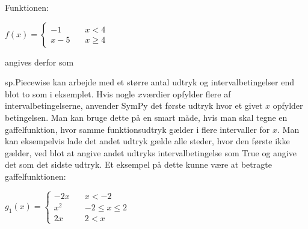 \documentclass[letterpaper,10pt,english]{jupyterBook}
\begin{document}
\begin{sphinxVerbatim}[commandchars=\\\{\}]
   
\end{sphinxVerbatim}

Funktionen:

\(f(x) = \begin{cases} -1 \quad &x < 4 \\ x - 5 \quad &x \geq 4\end{cases}\)

angives derfor som

\begin{sphinxVerbatim}[commandchars=\\\{\}]
         

        
\end{sphinxVerbatim}

\noindent{}

sp.Piecewise kan arbejde med et større antal udtryk og intervalbetingelser end blot to som i eksemplet. Hvis nogle \(x\)\sphinxhyphen{}værdier opfylder flere af intervalbetingelserne, anvender SymPy det første udtryk hvor et givet \(x\) opfylder betingelsen. Man kan bruge dette på en smart måde, hvis man skal tegne en gaffelfunktion, hvor samme funktionsudtryk gælder i flere intervaller for \(x\). Man kan eksempelvis lade det andet udtryk gælde alle steder, hvor den første ikke gælder, ved blot at angive andet udtryks intervalbetingelse som True og angive det som det sidste udtryk. Et eksempel på dette kunne være at betragte gaffelfunktionen:

\(g_1(x) = \begin{cases} -2x \quad &x < -2 \\ x^2 \quad &-2\leq x\leq 2\\ 2x \quad &2 < x\quad \end{cases}\)
\end{document}
